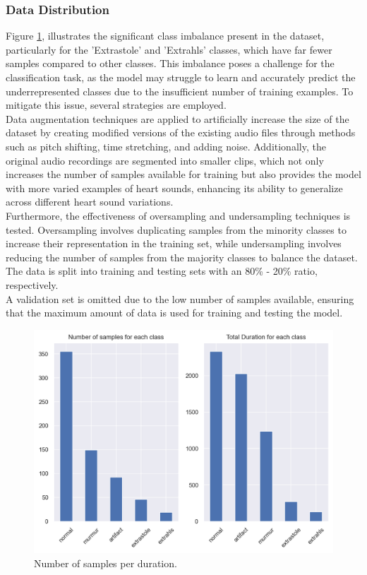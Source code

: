 \subsubsection*{Data Distribution} %
Figure \ref{fig:DataExp_num_durations}, illustrates the significant class imbalance present in the dataset, particularly for the 'Extrastole' and 'Extrahls' classes,
which have far fewer samples compared to other classes.
This imbalance poses a challenge for the classification task,
as the model may struggle to learn and accurately predict the underrepresented classes due to the insufficient number of training examples.
To mitigate this issue, several strategies are employed.\\
Data augmentation techniques are applied to artificially increase the size of the dataset
by creating modified versions of the existing audio files through methods such as pitch shifting, time stretching, and adding noise.
Additionally, the original audio recordings are segmented into smaller clips, which not only increases the number of samples available for training but
also provides the model with more varied examples of heart sounds, enhancing its ability to generalize across different heart sound variations.\\
Furthermore, the effectiveness of oversampling and undersampling techniques is tested. Oversampling involves duplicating samples from the minority classes
to increase their representation in the training set, while undersampling involves reducing the number of samples from the majority classes
to balance the dataset. The data is split into training and testing sets with an 80\% - 20\% ratio, respectively.\\
A validation set is omitted due to the low number of samples available, ensuring that the maximum amount of data is used for training and testing the model.
\begin{figure}[h]
    \centering
    \includegraphics[width=\columnwidth]{./images/DataExp_num_durations.png}
    \caption{Number of samples per duration.}
    \label{fig:DataExp_num_durations}
\end{figure}

